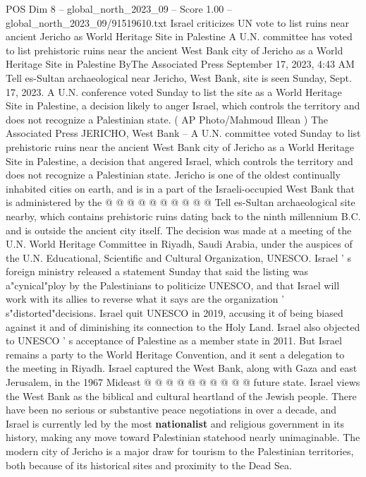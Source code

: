 \begin{textsample}{POS Dim 8 – global\_north\_2023\_09 – Score 1.00 – global\_north\_2023\_09/91519610.txt}  \label{ex:f8_pos_127}
Israel criticizes UN vote to list ruins near ancient Jericho as World Heritage Site in Palestine A U.N. committee has voted to list prehistoric ruins near the ancient West Bank city of Jericho as a World Heritage Site in Palestine ByThe Associated Press September 17, 2023, 4:43 AM Tell es-Sultan archaeological near Jericho, West Bank, site is seen Sunday, Sept. 17, 2023.
A U.N. conference voted Sunday to list the site as a World Heritage Site in Palestine, a decision likely to anger Israel, which controls the territory and does not recognize a Palestinian state. ( AP Photo/Mahmoud Illean ) The Associated Press JERICHO, West Bank -- A U.N. committee voted Sunday to list prehistoric ruins near the ancient West Bank city of Jericho as a World Heritage Site in Palestine, a decision that angered Israel, which controls the territory and does not recognize a Palestinian state.
Jericho is one of the oldest continually inhabited cities on earth, and is in a part of the Israeli-occupied West Bank that is administered by the @ @ @ @ @ @ @ @ @ @ Tell es-Sultan archaeological site nearby, which contains prehistoric ruins dating back to the ninth millennium B.C. and is outside the ancient city itself.
The decision was made at a meeting of the U.N.
World Heritage Committee in Riyadh, Saudi Arabia, under the auspices of the U.N.
Educational, Scientific and Cultural Organization, UNESCO.
Israel ' s foreign ministry released a statement Sunday that said the listing was a"cynical"ploy by the Palestinians to politicize UNESCO, and that Israel will work with its allies to reverse what it says are the organization ' s"distorted"decisions.
Israel quit UNESCO in 2019, accusing it of being biased against it and of diminishing its connection to the Holy Land.
Israel also objected to UNESCO ' s acceptance of Palestine as a member state in 2011.
But Israel remains a party to the World Heritage Convention, and it sent a delegation to the meeting in Riyadh.
Israel captured the West Bank, along with Gaza and east Jerusalem, in the 1967 Mideast @ @ @ @ @ @ @ @ @ @ future state.
Israel views the West Bank as the biblical and cultural heartland of the Jewish people.
There have been no serious or substantive peace negotiations in over a decade, and Israel is currently led by the most \textbf{nationalist} and religious government in its history, making any move toward Palestinian statehood nearly unimaginable.
The modern city of Jericho is a major draw for tourism to the Palestinian territories, both because of its historical sites and proximity to the Dead Sea.

\end{textsample}
